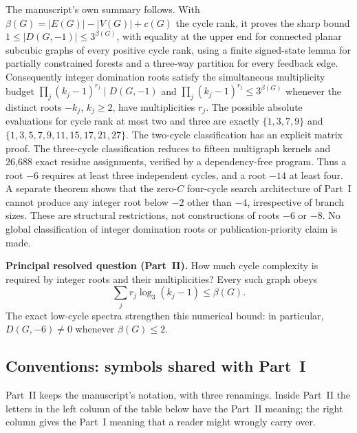 \documentclass[11pt]{article}
\numberwithin{equation}{section}
\theoremstyle{definition}
\begin{document}
The manuscript's own summary follows. With \(\beta(G)=|E(G)|-|V(G)|+c(G)\)
the cycle rank, it proves the sharp bound \(1\le|D(G,-1)|\le3^{\beta(G)}\),
with equality at the upper end for connected planar subcubic graphs of every
positive cycle rank, using a finite signed-state lemma for partially
constrained forests and a three-way partition for every feedback edge.
Consequently integer domination roots satisfy the simultaneous multiplicity
budget \(\prod_j(k_j-1)^{r_j}\mid D(G,-1)\) and
\(\prod_j(k_j-1)^{r_j}\le3^{\beta(G)}\) whenever the distinct roots \(-k_j\),
\(k_j\ge2\), have multiplicities \(r_j\). The possible absolute evaluations
for cycle rank at most two and three are exactly \(\{1,3,7,9\}\) and
\(\{1,3,5,7,9,11,15,17,21,27\}\). The two-cycle classification has an
explicit matrix proof. The three-cycle classification reduces to fifteen
multigraph kernels and 26,688 exact residue assignments, verified by a
dependency-free program. Thus a root \(-6\) requires at least three
independent cycles, and a root \(-14\) at least four. A separate theorem
shows that the zero-\(C\) four-cycle search architecture of Part~I cannot
produce any integer root below \(-2\) other than \(-4\), irrespective of
branch sizes. These are structural restrictions, not constructions of roots
\(-6\) or \(-8\). No global classification of integer domination roots or
publication-priority claim is made.

\begin{resultbox}
\textbf{Principal resolved question (Part~II).} How much cycle complexity
is required by integer roots and their multiplicities? Every such graph
obeys
\[
 \boxed{\quad \sum_jr_j\log_3(k_j-1)\le\beta(G).\quad}
\]
The exact low-cycle spectra strengthen this numerical bound: in particular,
$D(G,-6)\ne0$ whenever $\beta(G)\le2$.
\end{resultbox}

\subsection{Conventions: symbols shared with Part~I}\label{cb:sec:conventions}
Part~II keeps the manuscript's notation, with three renamings. Inside
Part~II the letters in the left column of the table below have the
Part~II meaning; the right column gives the Part~I meaning that a reader
might wrongly carry over.
\end{document}
